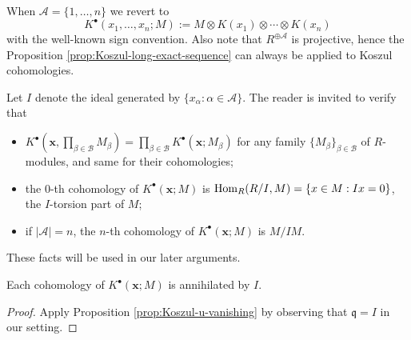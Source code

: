 When $\mathcal{A} = \{1, \ldots, n\}$ we revert to
\[ K^\bullet(x_1, \ldots, x_n; M) := M \otimes K(x_1) \otimes \cdots \otimes K(x_n) \]
with the well-known sign convention. Also note that $R^{\oplus \mathcal{A}}$ is projective, hence the Proposition \ref{prop:Koszul-long-exact-sequence} can always be applied to Koszul cohomologies.

Let $I$ denote the ideal generated by $\{x_\alpha: \alpha \in \mathcal{A} \}$. The reader is invited to verify that
\begin{itemize}
	\item $K^\bullet\left( \mathbf{x}, \prod_{\beta \in \mathcal{B}} M_\beta \right) = \prod_{\beta \in \mathcal{B}} K^\bullet(\mathbf{x}; M_\beta)$ for any family $\{M_\beta\}_{\beta \in \mathcal{B}}$ of $R$-modules, and same for their cohomologies;
	\item the $0$-th cohomology of $K^\bullet(\mathbf{x}; M)$ is $\operatorname{Hom}_R(R/I, M) = \{x \in M: Ix=0 \}$, the $I$-torsion part of $M$;
	\item if $|\mathcal{A}| = n$, the $n$-th cohomology of $K^\bullet(\mathbf{x}; M)$ is $M/IM$.
\end{itemize}
These facts will be used in our later arguments.

\begin{lemma}\label{prop:Koszul-coho-ann}
	Each cohomology of $K^\bullet(\mathbf{x}; M)$ is annihilated by $I$.
\end{lemma}
\begin{proof}
	Apply Proposition \ref{prop:Koszul-u-vanishing} by observing that $\mathfrak{q} = I$ in our setting.
\end{proof}

